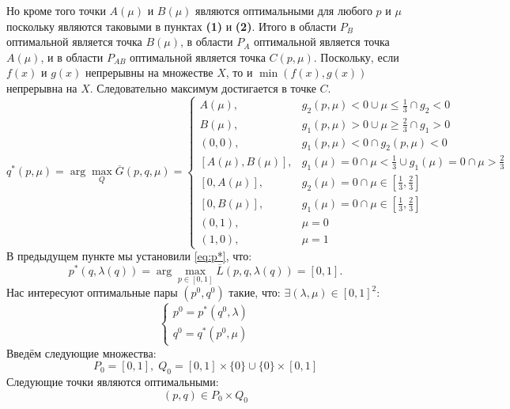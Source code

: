 Но кроме того точки $A(\mu)$ и $B(\mu)$ являются оптимальными 
для любого $p$ и $\mu$ поскольку являются таковыми в 
пунктах \textbf{(1)} и \textbf{(2)}. 
Итого в области $P_B$ оптимальной является точка $B(\mu)$,
в области $P_A$ оптимальной является точка $A(\mu)$,
и в области $P_{AB}$ оптимальной является точка $C(p, \mu)$.
Поскольку, если $f(x)$ и $g(x)$ непрерывны на множестве $X$, то и 
$\min(f(x), g(x))$ непрерывна на $X$. Следовательно максимум достигается
 в точке $C$.
$$
	q^*(p,\mu)= \arg \max \limits_Q \overline{G}(p,q,\mu) =
	\begin{cases}
		A(\mu), & 
		g_2(p,\mu)<0 \cup \mu \leqslant \frac{1}{3} \cap g_2 < 0 
		\\
		B(\mu), & 
		g_1(p,\mu)>0 \cup \mu \geqslant \frac{2}{3} \cap g_1 > 0 
		\\
		(0,0),  & 
		g_1(p,\mu)<0 \cap g_2(p,\mu)<0 
		\\
		[A(\mu), B(\mu)], & 
		g_1(\mu)=0 \cap \mu < \frac{1}{3} \cup
		g_1(\mu)=0 \cap \mu > \frac{2}{3} 
		\\
		[0, A(\mu)], & 
		g_2(\mu)=0 \cap \mu \in [\frac{1}{3},\frac{2}{3}]
		\\
		[0, B(\mu)], & 
		g_1(\mu)=0 \cap \mu \in [\frac{1}{3},\frac{2}{3}] 
		\\
		(0,1), & 
		\mu = 0 
		\\
		(1,0), & 
		\mu = 1
	\end{cases}	
$$		
В предыдущем пункте мы установили \eqref{eq:p*}, что:
$$
	p^*(q,\lambda(q))=\arg \max \limits_{p \in [0,1]}
	\overline{L}(p, q, \lambda(q))=[0,1].
$$
Нас интересуют оптимальные пары $(p^0,q^0)$ такие, что:
$\exists (\lambda, \mu) \in [0,1]^2 $:
$$
	\begin{cases}
		p^0=p^*(q^0,\lambda) \\
		q^0=q^*(p^0,\mu)
	\end{cases}
$$
Введём следующие множества:
$$
	P_0=[0,1], \; Q_0=[0,1] \times \{0\} \cup \{0\} \times [0,1]
$$
Следующие точки являются оптимальными:
$$(p, q) \in P_0 \times Q_0$$